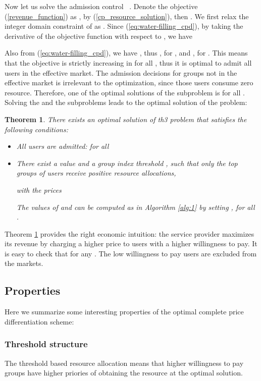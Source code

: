 \documentclass[twocolumn,10pt,twosided]{IEEEtran}
\newtheorem{theorem}{Theorem}
\begin{document}
Now let us solve the admission control ~. Denote the objective  (\ref{revenue_function}) as , by (\ref{cp_resource_solution}), then . We first relax the integer domain constraint of  as . Since (\ref{eq:water-filling_cpd}), by taking the derivative of the objective function  with respect to , we have

Also from (\ref{eq:water-filling_cpd}), we have
,
thus , for , and , for . This means that the objective 
is strictly increasing in  for all , thus it is optimal to admit all users in the effective market. The admission decisions for groups not in the effective market is irrelevant to the optimization, since those users consume zero resource. Therefore, one of the optimal solutions of the
 subproblem is  for all .
Solving the  and the  subproblems  leads to the optimal solution of  the  problem:
\begin{theorem}\label{thm:opt}
There exists an optimal solution of th3  problem that satisfies the following conditions:
\begin{itemize}
    \item All users are admitted:  for all 
    \item There exist a value  and a group index threshold , such that only the top  groups of users receive positive resource allocations,

with the prices

The values of  and  can be computed as in Algorithm \ref{alg:1} by setting , for all .
\end{itemize}
\end{theorem}

Theorem \ref{thm:opt} provides the right economic intuition: the service provider maximizes its revenue by charging a higher price to users with a higher willingness to pay. It is easy to check that  for any . The low willingness to pay users are excluded from the markets.

\subsection{Properties}
\label{sub_sec:cpd}
Here we summarize some interesting properties of the optimal complete price differentiation scheme:
\subsubsection{Threshold structure} The threshold based resource allocation means that higher willingness to pay groups have higher priories of obtaining the resource at the optimal solution.
\end{document}
